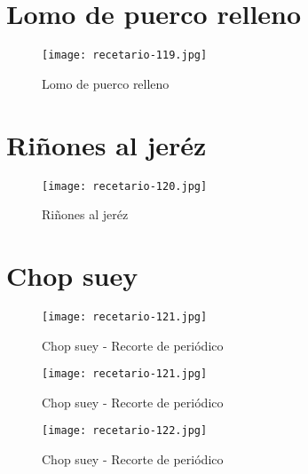 \documentclass[12pt,letterpaper]{article}
\begin{document}
\newpage

\section{Lomo de puerco relleno}
  \begin{figure}[H]
    \vspace{2pt}
  \texttt{[image: recetario-119.jpg]}
    \caption{Lomo de puerco relleno}
    
  \end{figure}

\newpage

\section{Riñones al jeréz}
  \begin{figure}[H]
    \vspace{2pt}
  \texttt{[image: recetario-120.jpg]}
    \caption{Riñones al jeréz}
    
  \end{figure}

\newpage

\section{Chop suey}
  \begin{figure}[H]
    \vspace{2pt}
  \texttt{[image: recetario-121.jpg]}
    \caption{Chop suey - Recorte de periódico}
    
  \end{figure}

\newpage


  \begin{figure}[H]
    \vspace{2pt}
  \texttt{[image: recetario-121.jpg]}
    \caption{Chop suey - Recorte de periódico}
    
  \end{figure}

\newpage


  \begin{figure}[H]
    \vspace{2pt}
  \texttt{[image: recetario-122.jpg]}
    \caption{Chop suey - Recorte de periódico}
    
  \end{figure}
\end{document}
